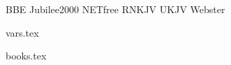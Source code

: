 \load[opbible]  %
\enquotes

 \cnvtext{[}{\bgroup\it}   \cnvtext{]}{\/\egroup} 


\ifx\tmark\undefined
\def\tmark   {BBE}        
\fi

\def\txsfile   {./txs/\tmark-\bmark.txs}     %
\def\fmtfile   {./fmt/fmt-\tmark-\amark.tex} %
\def\notesfile {./notes/notes-\amark.tex}         %
\def\introfile   {./intros/intro-\amark.tex}       %
\def\articlefile {./articles/articles-\amark.tex}    %

\switch
     {BBE}        {\def\bibname{Bible in Basic English}}%
     {Jubilee2000}{\def\bibname{Jubilee 2000 Bible}}%
     {NETfree}    {\def\bibname{New English Translation}}%
     {RNKJV}      {\def\bibname{Restored Name King James Version}}%
     {UKJV}       {\def\bibname{Updated King James Version}}%
     {Webster}    {\def\bibname{Noah Webster's Bible}}%

   {}


 {vars.tex}         %

 {books.tex}  %




\def\printedbooks{Dan}


\processbooks %

\bye
